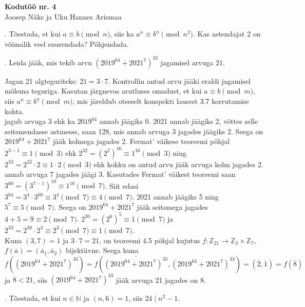 \documentclass[a4paper, 10pt]{article}
\newcommand{\Z}{\mathbb{Z}}
\newcommand{\N}{\mathbb{N}}
\begin{document}
\begin{center}
\Large\textbf{Kodutöö nr. 4}\\
\small{Joosep Näks ja Uku Hannes Arismaa}
\end{center}

\bigskip
\bigskip

. Tõestada, et kui $a\equiv b\pmod{n}$, siis ka $a^n\equiv b^n\pmod{n^2}$. Kas astendajat 2 on võimalik veel suurendada? Põhjendada. 

\bigskip

. Leida j\"a\"ak, mis tekib arvu $(2019^{64}+2021^{7})^{33}$ jagamisel arvuga $21$.

\bigskip

Jagan 21 algteguriteks: $21=3\cdot7$. Kontrollin antud arvu jääki eraldi jagamisel mõlema teguriga. Kasutan järgnevas arutluses omadust, et kui $a\equiv b\pmod m$, siis $a^n\equiv b^n\pmod m$, mis järeldub otseselt konspekti lausest 3.7 korrutamise kohta.\\
 jagub arvuga 3 ehk ka $2019^{64}$ annab jäägiks 0. 2021 annab jäägiks 2, võttes selle seitsmendasse astmesse, saan 128, mis annab arvuga 3 jagades jäägiks 2. Seega on $2019^{64}+2021^7$ jääk kolmega jagades 2. Fermat' väikese teoreemi põhjal $2^{3-1}\equiv1\pmod 3$ ehk $2^{32}=(2^2)^{16}\equiv1^{16}\pmod 3$ ning $2^{33}=2^{32}\cdot2\equiv1\cdot2\pmod 3$ ehk kokku on antud arvu jääk arvuga kolm jagades 2.\\
 annab arvuga 7 jagades jäägi 3. Kasutades Fermat' väikest teoreemi saan $3^{60}=(3^{7-1})^{10}\equiv1^{10}\pmod 7$. Siit edasi $3^{64} = 3^4\cdot3^{60}\equiv3^4\pmod 7\equiv4\pmod7$. 2021 annab jäägiks 5 ning $5^7\equiv5\pmod7$. Seega on $2019^{64}+2021^7$ jääk seitsmega jagades $4+5=9\equiv2\pmod7$. $2^{30}=(2^6)^5\equiv1\pmod7$ ja $2^{33}=2^{30}\cdot2^3\equiv2^3\pmod7\equiv1\pmod7$.\\
Kuna $(3,7)=1$ ja $3\cdot7=21$, on teoreemi 4.5 põhjal kujutus $f:\Z_{21}\rightarrow\Z_3\times\Z_7$, $f(\overline a)=(\overline a_1,\overline a_2)$ bijektiivne. Seega kuna $f(\overline{(2019^{64}+2021^{7})^{33}})=f(\overline{(2019^{64}+2021^{7})^{33}},\overline{(2019^{64}+2021^{7})^{33}})=(\overline2,\overline1)=f(\overline8)$ ja $8<21$, siis $(2019^{64}+2021^{7})^{33}$ jääk arvuga 21 jagades on 8.

\bigskip

. Tõestada, et kui $n\in\N$ ja $(n,6)=1$, siis $24\mid n^2-1$.

\bigskip
\end{document}
